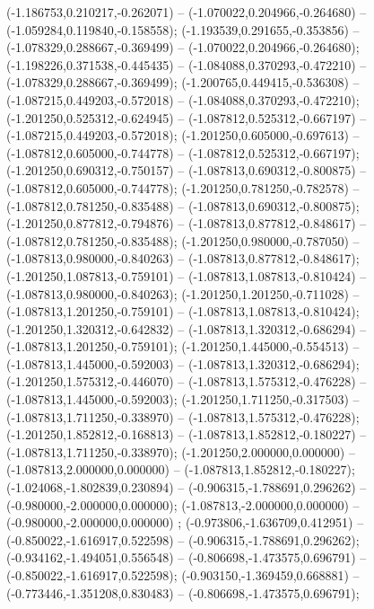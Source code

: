  (-1.186753,0.210217,-0.262071) -- (-1.070022,0.204966,-0.264680) -- (-1.059284,0.119840,-0.158558);
 (-1.193539,0.291655,-0.353856) -- (-1.078329,0.288667,-0.369499) -- (-1.070022,0.204966,-0.264680);
 (-1.198226,0.371538,-0.445435) -- (-1.084088,0.370293,-0.472210) -- (-1.078329,0.288667,-0.369499);
 (-1.200765,0.449415,-0.536308) -- (-1.087215,0.449203,-0.572018) -- (-1.084088,0.370293,-0.472210);
 (-1.201250,0.525312,-0.624945) -- (-1.087812,0.525312,-0.667197) -- (-1.087215,0.449203,-0.572018);
 (-1.201250,0.605000,-0.697613) -- (-1.087812,0.605000,-0.744778) -- (-1.087812,0.525312,-0.667197);
 (-1.201250,0.690312,-0.750157) -- (-1.087813,0.690312,-0.800875) -- (-1.087812,0.605000,-0.744778);
 (-1.201250,0.781250,-0.782578) -- (-1.087812,0.781250,-0.835488) -- (-1.087813,0.690312,-0.800875);
 (-1.201250,0.877812,-0.794876) -- (-1.087813,0.877812,-0.848617) -- (-1.087812,0.781250,-0.835488);
 (-1.201250,0.980000,-0.787050) -- (-1.087813,0.980000,-0.840263) -- (-1.087813,0.877812,-0.848617);
 (-1.201250,1.087813,-0.759101) -- (-1.087813,1.087813,-0.810424) -- (-1.087813,0.980000,-0.840263);
 (-1.201250,1.201250,-0.711028) -- (-1.087813,1.201250,-0.759101) -- (-1.087813,1.087813,-0.810424);
 (-1.201250,1.320312,-0.642832) -- (-1.087813,1.320312,-0.686294) -- (-1.087813,1.201250,-0.759101);
 (-1.201250,1.445000,-0.554513) -- (-1.087813,1.445000,-0.592003) -- (-1.087813,1.320312,-0.686294);
 (-1.201250,1.575312,-0.446070) -- (-1.087813,1.575312,-0.476228) -- (-1.087813,1.445000,-0.592003);
 (-1.201250,1.711250,-0.317503) -- (-1.087813,1.711250,-0.338970) -- (-1.087813,1.575312,-0.476228);
 (-1.201250,1.852812,-0.168813) -- (-1.087813,1.852812,-0.180227) -- (-1.087813,1.711250,-0.338970);
 (-1.201250,2.000000,0.000000) -- (-1.087813,2.000000,0.000000) -- (-1.087813,1.852812,-0.180227);
 (-1.024068,-1.802839,0.230894) -- (-0.906315,-1.788691,0.296262) -- (-0.980000,-2.000000,0.000000);
 (-1.087813,-2.000000,0.000000) -- (-0.980000,-2.000000,0.000000) ;
 (-0.973806,-1.636709,0.412951) -- (-0.850022,-1.616917,0.522598) -- (-0.906315,-1.788691,0.296262);
 (-0.934162,-1.494051,0.556548) -- (-0.806698,-1.473575,0.696791) -- (-0.850022,-1.616917,0.522598);
 (-0.903150,-1.369459,0.668881) -- (-0.773446,-1.351208,0.830483) -- (-0.806698,-1.473575,0.696791);
